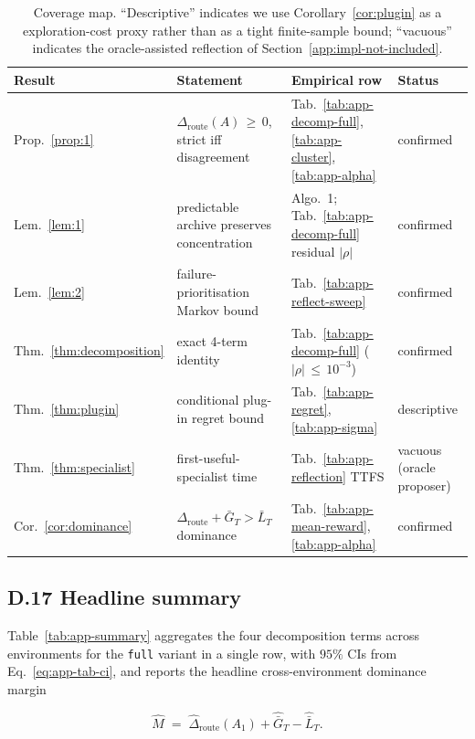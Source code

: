 \documentclass{article} %
\begin{document}
\begin{table}[h]
\centering
\small
\begin{tabular}{llll}
\toprule
Result & Statement & Empirical row & Status \\
\midrule
Prop.~\ref{prop:1}      & $\Delta_{\mathrm{route}}(A) \,\ge\, 0$, strict iff disagreement & Tab.~\ref{tab:app-decomp-full}, \ref{tab:app-cluster}, \ref{tab:app-alpha} & confirmed \\
Lem.~\ref{lem:1}        & predictable archive preserves concentration & Algo.~1; Tab.~\ref{tab:app-decomp-full} residual $|\rho|$ & confirmed \\
Lem.~\ref{lem:2}        & failure-prioritisation Markov bound & Tab.~\ref{tab:app-reflect-sweep} & confirmed \\
Thm.~\ref{thm:decomposition} & exact 4-term identity & Tab.~\ref{tab:app-decomp-full} ($|\rho|\,\le\, 10^{-3}$) & confirmed \\
Thm.~\ref{thm:plugin}   & conditional plug-in regret bound & Tab.~\ref{tab:app-regret}, \ref{tab:app-sigma} & descriptive \\
Thm.~\ref{thm:specialist} & first-useful-specialist time & Tab.~\ref{tab:app-reflection} TTFS & vacuous (oracle proposer) \\
Cor.~\ref{cor:dominance} & $\Delta_{\mathrm{route}}+\bar G_T > \bar L_T$ dominance & Tab.~\ref{tab:app-mean-reward}, \ref{tab:app-alpha} & confirmed \\
\bottomrule
\end{tabular}
\caption{Coverage map. ``Descriptive'' indicates we use Corollary~\ref{cor:plugin} as a exploration-cost proxy rather than as a tight finite-sample bound; ``vacuous'' indicates the oracle-assisted reflection of Section~\ref{app:impl-not-included}.}
\label{tab:app-coverage}
\end{table}

\subsection{D.17 Headline summary}

\label{app:tab-summary}

Table~\ref{tab:app-summary} aggregates the four decomposition terms across environments for the \texttt{full} variant in a single row, with $95\%$ CIs from Eq.~\eqref{eq:app-tab-ci}, and reports the headline cross-environment dominance margin

\begin{equation}
\label{eq:app-tab-margin}
\widehat M \;=\; \widehat\Delta_{\mathrm{route}}(A_1) + \widehat{\bar G}_T - \widehat{\bar L}_T.
\end{equation}
\end{document}

